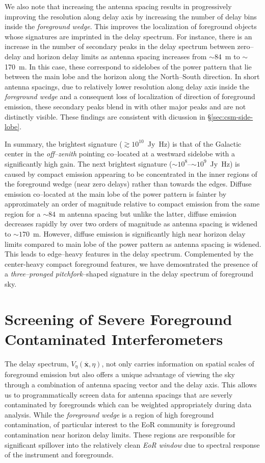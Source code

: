 \documentclass[preprint2,iop,numberedappendix]{emulateapj}
\begin{document}
We also note that increasing the antenna spacing results in progressively improving the resolution along delay axis by increasing the number of delay bins inside the {\it foreground wedge}. This improves the localization of foreground objects whose signatures are imprinted in the delay spectrum. For instance, there is an increase in the number of secondary peaks in the delay spectrum between zero--delay and horizon delay limits as antenna spacing increases from $\sim$84~m to $\sim$170~m. In this case, these correspond to sidelobes of the power pattern that lie between the main lobe and the horizon along the North--South direction. In short antenna spacings, due to relatively lower resolution along delay axis inside the {\it foreground wedge} and a consequent loss of localization of direction of foreground emission, these secondary peaks blend in with other major peaks and are not distinctly visible. These findings are consistent with dicussion in \S\ref{sec:csm-side-lobe}.

In summary, the brightest signature ($\gtrsim 10^{10}$~Jy~Hz) is that of the Galactic center in the {\it off--zenith} pointing co--located at a westward sidelobe with a significantly high gain. The next brightest signature ($\sim 10^8$--$\sim 10^9$~Jy~Hz) is caused by compact emission appearing to be concentrated in the inner regions of the foreground wedge (near zero delays) rather than towards the edges. Diffuse emission co--located at the main lobe of the power pattern is fainter by approximately an order of magnitude relative to compact emission from the same region for a $\sim 84$~m antenna spacing but unlike the latter, diffuse emission decreases rapidly by over two orders of magnitude as antenna spacing is widened to $\sim 170$~m. However, diffuse emission is significantly high near horizon delay limits compared to main lobe of the power pattern as antenna spacing is widened. This leads to edge--heavy features in the delay spectrum. Complemented by the center-heavy compact foreground features, we have demosntrated the presence of a {\it three--pronged pitchfork}--shaped signature in the delay spectrum of foreground sky.

\section{Screening of Severe Foreground Contaminated Interferometers}\label{sec:fg-grading}

The delay spectrum, $V_\eta(\overline{\mathbf{x}},\eta)$, not only carries information on spatial scales of foreground emission but also offers a unique advantage of viewing the sky through a combination of antenna spacing vector and the delay axis. This allows us to programmatically screen data for antenna spacings that are severly contaminated by foregrounds which can be weighted appropriately during data analysis. While the {\it foreground wedge} is a region of high foreground contamination, of particular interest to the EoR community is foreground contamination near horizon delay limits. These regions are responsible for significant spillover into the relatively clean {\it EoR window} due to spectral response of the instrument and foregrounds. 
\end{document}
